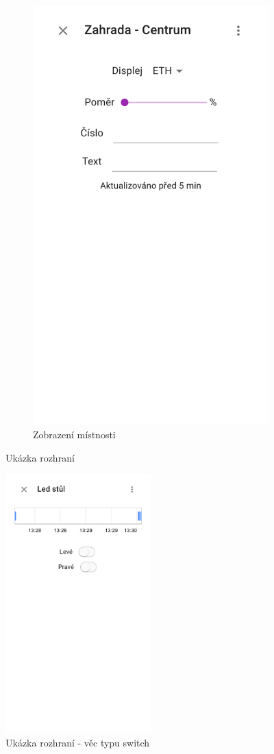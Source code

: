 \documentclass[thesis=B,czech]{FITthesis}[2019/12/23]
\begin{document}
\begin{figure}
\begin{subfigure}{.5\textwidth}
        \includegraphics[width=.7\linewidth]{img/screens/generic.png}
        \caption{Zobrazení místnosti}
    \end{subfigure}
    \caption{Ukázka rozhraní}
\end{figure}



\begin{figure}[htbp]
    \centering
    \includegraphics[width=0.5\textwidth]{img/screens/led.png}
    \caption{Ukázka rozhraní - věc typu switch}
\end{figure}
\end{document}
